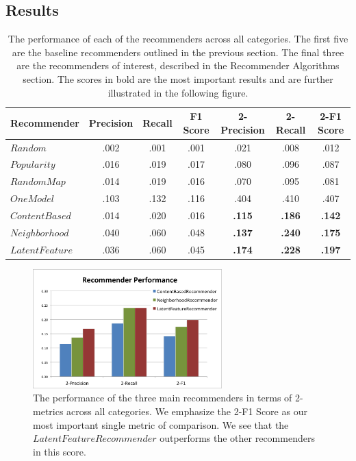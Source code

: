 \documentclass[11pt]{article}
\begin{document}
\subsection*{Results}

\begin{table}
\begin{center}
\begin{tabular}{ | l || c | c | c || c | c | c |}
\hline
Recommender & Precision & Recall & F1 Score & 2-Precision & 2-Recall & 2-F1 Score \\ \hline\hline
$Random$ & .002 & .001 & .001 & .021 & .008 & .012 \\ \hline
$Popularity$ & .016 & .019 & .017 & .080 & .096 & .087 \\ \hline
$RandomMap$ & .014 & .019 & .016 & .070 & .095 & .081 \\ \hline
$OneModel$ & .103 & .132 & .116 & .404 & .410 & .407 \\ \hline
$ContentBased$ & .014 & .020 & .016 &
\textbf{.115} & \textbf{.186} & \textbf{.142} \\ \hline 
$Neighborhood$ & .040 & .060 & .048 &
\textbf{.137} & \textbf{.240} & \textbf{.175} \\ \hline 
$LatentFeature$ & .036 & .060 & .045 &
\textbf{.174} & \textbf{.228} & \textbf{.197} \\ \hline
\end{tabular}
\caption{The performance of each of the recommenders across all categories. The
first five are the baseline recommenders outlined in the previous section. The
final three are the recommenders of interest, described in the Recommender
Algorithms section. The scores in bold are the most important results and are 
further illustrated in the following figure.}
\end{center}
\end{table}
\begin{figure}[!htbp]
    \centering
    \includegraphics[width=0.65\textwidth]{RecommenderPerformance2.png}
	\caption{The performance of the three main recommenders in terms of
    2-metrics across all categories. We emphasize the 2-F1 Score as our most
    important single metric of comparison. We see that the $LatentFeatureRecommender$
    outperforms the other recommenders in this score.} 
    \label{fig:RecommenderPerformance} 
\end{figure}
\pagebreak
\end{document}
